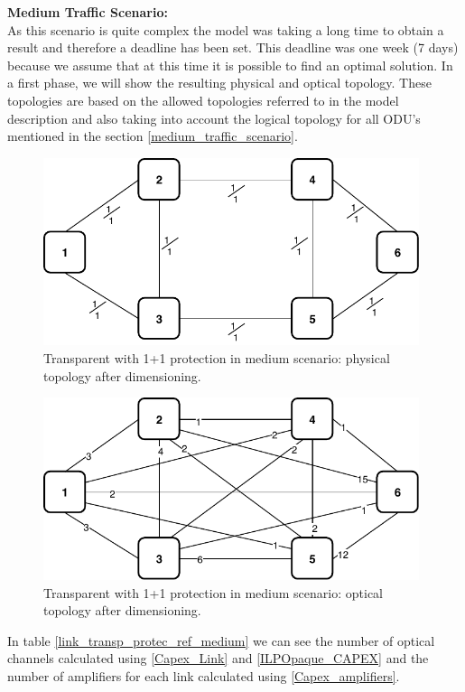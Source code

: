 \textbf{Medium Traffic Scenario:}\\

As this scenario is quite complex the model was taking a long time to obtain a result and therefore a deadline has been set. This deadline was one week (7 days) because we assume that at this time it is possible to find an optimal solution. In a first phase, we will show the resulting physical and optical topology. These topologies are based on the allowed topologies referred to in the model description and also taking into account the logical topology for all ODU's mentioned in the section \ref{medium_traffic_scenario}.\\

\begin{figure}[h!]
\centering
\includegraphics[width=11cm]{sdf/ilp/transparent_protection/figures/physical_topology}
\caption{Transparent with 1+1 protection in medium scenario: physical topology after dimensioning.}
\label{physical2_protectionmedium}
\end{figure}

\newpage
\begin{figure}[h!]
\centering
\includegraphics[width=11cm]{sdf/ilp/transparent_protection/figures/optical_topology_medium}
\caption{Transparent with 1+1 protection in medium scenario: optical topology after dimensioning.}
\label{optical2_protectionmedium}
\end{figure}

\vspace{15pt}
In table \ref{link_transp_protec_ref_medium} we can see the number of optical channels calculated using \ref{Capex_Link} and \ref{ILPOpaque_CAPEX} and the number of amplifiers for each link calculated using \ref{Capex_amplifiers}.\\

